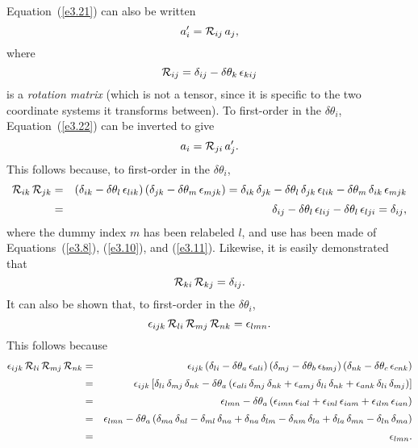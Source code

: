 Equation~(\ref{e3.21}) can also be written
\begin{equation}\label{e3.22}
a_i' = {\cal R}_{ij}\,a_j,
\end{equation}
where
\begin{equation}\label{e3.21x}
{\cal R}_{ij}  = \delta_{ij} - \delta{\theta}_k\,\epsilon_{kij}
\end{equation}
is a {\em rotation matrix}\/ (which is not a tensor, since it is specific to the two coordinate systems it transforms
between).
To first-order in the $\delta\theta_i$,  Equation~(\ref{e3.22}) can be inverted to give
\begin{equation}\label{e3.24}
a_i = {\cal R}_{ji}\,a_j'.
\end{equation}
This follows because, to first-order in the $\delta\theta_i$,
\begin{eqnarray}
{\cal R}_{ik}\,{\cal R}_{jk}&=& (\delta_{ik}-\delta{\theta}_l\,\epsilon_{lik})\,(\delta_{jk}-\delta\theta_m\,\epsilon_{mjk})
= \delta_{ik}\,\delta_{jk}-\delta\theta_l\,\delta_{jk}\,\epsilon_{lik} -\delta\theta_m\,\delta_{ik}\,\epsilon_{mjk}\nonumber\\[0.5ex]
&=& \delta_{ij} -\delta\theta_l\,\epsilon_{lij}-\delta\theta_l\,\epsilon_{lji}=\delta_{ij},\label{e3.25}
\end{eqnarray} 
where the dummy index $m$ has been relabeled $l$, and use has been made of Equations~(\ref{e3.8}), (\ref{e3.10}), and (\ref{e3.11}). Likewise, it is easily demonstrated that
\begin{equation}
{\cal R}_{ki}\,{\cal R}_{kj } = \delta_{ij}.\label{e3.27}
\end{equation}
It can also be shown that, to first-order in the $\delta\theta_i$, 
\begin{equation}
\epsilon_{ijk}\,{\cal R}_{li}\,{\cal R}_{mj}\,{\cal R}_{nk} = \epsilon_{lmn}.
\end{equation}
This follows because
\begin{eqnarray}
\epsilon_{ijk}\,{\cal R}_{li}\,{\cal R}_{mj}\,{\cal R}_{nk} &=& \epsilon_{ijk}\,(\delta_{li}-\delta\theta_a\,\epsilon_{ali})\,(\delta_{mj}-\delta\theta_b\,\epsilon_{bmj})\,(\delta_{nk}-\delta\theta_c\,\epsilon_{cnk})\nonumber\\[0.5ex]
&=&\epsilon_{ijk}\left[\delta_{li}\,\delta_{mj}\,\delta_{nk}-\delta\theta_a\left(\epsilon_{ali}\,\delta_{mj}\,\delta_{nk}
+\epsilon_{amj}\,\delta_{li}\,\delta_{nk} +\epsilon_{ank}\,\delta_{li}\,\delta_{mj}\right)\right]\nonumber\\[0.5ex]
&=& \epsilon_{lmn} -\delta\theta_a\left(\epsilon_{imn}\,\epsilon_{ial}+\epsilon_{inl}\,\epsilon_{iam}
+\epsilon_{ilm}\,\epsilon_{ian}\right)\nonumber\\[0.5ex]
&=& \epsilon_{lmn}-\delta\theta_a\left(\delta_{ma}\,\delta_{nl}-\delta_{ml}\,\delta_{na}+\delta_{na}\,\delta_{lm}-\delta_{nm}\,\delta_{la}+\delta_{la}\,\delta_{mn}-\delta_{ln}\,\delta_{ma}\right)\nonumber\\[0.5ex]
&=&\epsilon_{lmn}.\label{e3.30}
\end{eqnarray}
